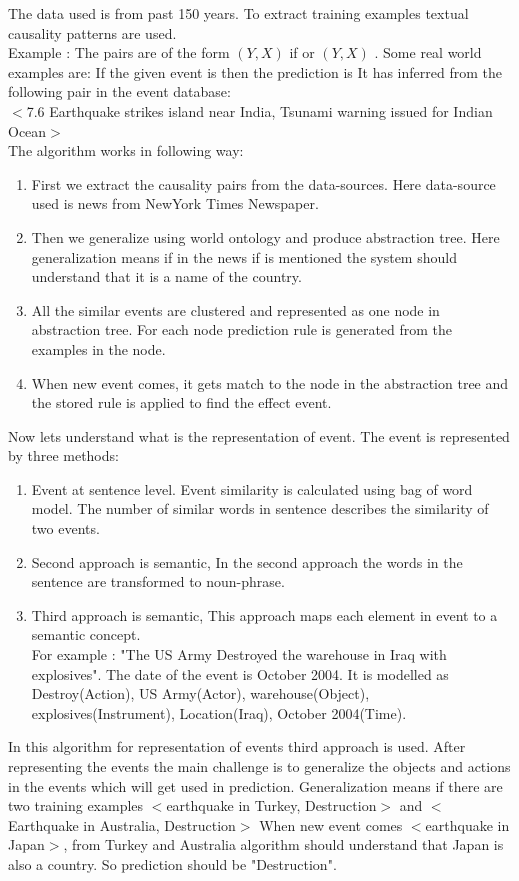 \documentclass[journal,onecolumn,11pt]{IEEEtran}
\begin{document}
The data used is from past 150 years. To extract training examples textual causality patterns are used.\\
Example : The pairs are of the form $(Y, X)$ if  or $(Y, X)$ .
Some real world examples are:
If the given event is  then the prediction is It has inferred from the following pair in the event database:\\
$<$7.6 Earthquake strikes island near India, Tsunami warning issued for Indian Ocean$>$\\
The algorithm works in following way:
\begin{enumerate}
    \item First we extract the causality pairs from the data-sources. Here data-source used is news from NewYork Times Newspaper.
    \item Then we generalize using world ontology and produce abstraction tree. Here generalization means if in the news if  is mentioned the system should understand that it is a name of the country.
    \item All the similar events are clustered and represented as one node in abstraction tree. For each node prediction rule is generated from the examples in the node.
    \item When new event comes, it gets match to the node in the abstraction tree and the stored rule is applied to find the effect event.
\end{enumerate}

Now lets understand what is the representation of event.
The event is represented by three methods:
\begin{enumerate}

\item Event at sentence level. Event similarity is calculated using bag of word model. The number of similar words in sentence describes the similarity of two events.
\item Second approach is semantic, In the second approach the words in the sentence are transformed to noun-phrase.
\item Third approach is semantic, This approach maps  each element in event to a semantic concept.\\
For example :  "The US Army Destroyed the warehouse in Iraq with explosives". The date of the event is October 2004. 
It is modelled as  Destroy(Action), US Army(Actor), warehouse(Object), explosives(Instrument), Location(Iraq), October 2004(Time).
\end{enumerate}
In this algorithm for representation of events third approach is used. After representing the events the main challenge is to generalize the objects and actions in the events which will get used in prediction. Generalization means if there are two training examples $<$earthquake in Turkey, Destruction$>$ and $<$Earthquake in Australia, Destruction$>$ When new event comes $<$earthquake in Japan$>$,
from Turkey and Australia algorithm should understand that Japan is also a country. So prediction should be "Destruction". 
\end{document}
